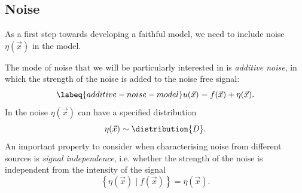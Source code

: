
\subsection{Noise}%

As a first step towards developing a faithful model, we need to include noise \(\eta(\vec{x})\) in the model.

The mode of noise that we will be particularly interested in is \emph{additive noise}, in which the strength of the 
    noise is added to the noise free signal:
\begin{equation}
    \labeq{additive-noise-model}
    u(\vec{x}) = f(\vec{x}) + \eta(\vec{x}).
\end{equation}
In  the noise \(\eta(\vec{x})\) can have a specified distribution
\begin{equation*}
    \eta(\vec{x}) \sim \distribution{D}.
\end{equation*}
An important property to consider when characterising noise from different sources is \emph{signal independence}, i.e. 
    whether the strength of the noise is independent from the intensity of the signal
\begin{equation*}
    \left\{ \eta(\vec{x}) \mid f(\vec{x})  \right\} = \eta(\vec{x}).
\end{equation*}


